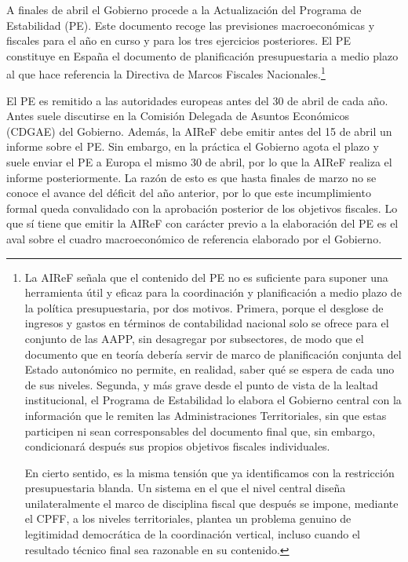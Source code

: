 \documentclass[10pt,a4paper]{article}
\begin{document}
A finales de abril el Gobierno procede a la Actualización del Programa de Estabilidad (PE). Este documento recoge las previsiones macroeconómicas y fiscales para el año en curso y para los tres ejercicios posteriores. El PE constituye en España el documento de planificación presupuestaria a medio plazo al que hace referencia la Directiva de Marcos Fiscales Nacionales.\footnote{%
    La AIReF señala que el contenido del PE no es suficiente para suponer una herramienta útil y eficaz para la coordinación y planificación a medio plazo de la política presupuestaria, por dos motivos. Primera, porque el desglose de ingresos y gastos en términos de contabilidad nacional solo se ofrece para el conjunto de las AAPP, sin desagregar por subsectores, de modo que el documento que en teoría debería servir de marco de planificación conjunta del Estado autonómico no permite, en realidad, saber qué se espera de cada uno de sus niveles. Segunda, y más grave desde el punto de vista de la lealtad institucional, el Programa de Estabilidad lo elabora el Gobierno central con la información que le remiten las Administraciones Territoriales, sin que estas participen ni sean corresponsables del documento final que, sin embargo, condicionará después sus propios objetivos fiscales individuales. 

En cierto sentido, es la misma tensión que ya identificamos con la restricción presupuestaria blanda. Un sistema en el que el nivel central diseña unilateralmente el marco de disciplina fiscal que después se impone, mediante el CPFF, a los niveles territoriales, plantea un problema genuino de legitimidad democrática de la coordinación vertical, incluso cuando el resultado técnico final sea razonable en su contenido.
}

El PE es remitido a las autoridades europeas antes del 30 de abril de cada año. Antes suele discutirse en la Comisión Delegada de Asuntos Económicos (CDGAE) del Gobierno. Además, la AIReF debe emitir antes del 15 de abril un informe sobre el PE. Sin embargo, en la práctica el Gobierno agota el plazo y suele enviar el PE a Europa el mismo 30 de abril, por lo que la AIReF realiza el informe posteriormente. La razón de esto es que hasta finales de marzo no se conoce el avance del déficit del año anterior, por lo que este incumplimiento formal queda convalidado con la aprobación posterior de los objetivos fiscales. Lo que sí tiene que emitir la AIReF con carácter previo a la elaboración del PE es el aval sobre el cuadro macroeconómico de referencia elaborado por el Gobierno. 
\end{document}
